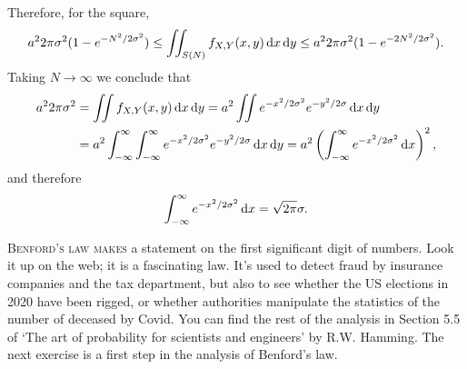 \documentclass[lectures]{subfiles}
\begin{document}
\begin{exercise}
\begin{solution}
Therefore, for the square,
\begin{equation}
a^{2}2\pi{\sigma^{2}} (1-e^{-N^{2}/2\sigma^{2}}) \leq
  \iint_{S(N)}f_{X,Y}(x,y) \,\textrm{d}x\,\textrm{d}y \leq
a^{2}2\pi{\sigma^{2}} (1-e^{-2N^{2}/2\sigma^{2}}).
\end{equation}
Taking $N\to\infty$ we conclude that
\begin{align}
a^{2}2\pi{\sigma^{2}}
&=\iint f_{X,Y}(x,y) \,\textrm{d}x\,\textrm{d}y
=a^{2}  \iint e^{-x^{2}/2\sigma^{2}} e^{-y^{2}/2\sigma} \,\textrm{d}x\,\textrm{d}y\\
&=a^{2}  \int_{-\infty}^{\infty} \int_{-\infty}^{\infty }e^{-x^{2}/2\sigma^{2}} e^{-y^{2}/2\sigma} \,\textrm{d}x\,\textrm{d}y
=a^{2} \left( \int_{-\infty}^{\infty }e^{-x^{2}/2\sigma^{2}} \,\textrm{d}x\right)^{2},
\end{align}
and therefore
\begin{equation}
\label{eq:0518}
\int_{-\infty}^{\infty }e^{-x^{2}/2\sigma^{2}} \,\textrm{d}x = \sqrt{2 \pi}\sigma.
\end{equation}
\end{solution}
\end{exercise}


\textsc{Benford's law makes} a statement on the first significant digit of numbers.
Look it up on the web; it is a fascinating law.
It's used to detect fraud by insurance companies and the tax department, but also to see whether the US elections in 2020 have been rigged, or whether authorities manipulate the statistics of the number of deceased by Covid.
You can find the rest of the analysis in Section 5.5 of `The art of probability for scientists and engineers' by R.W.
Hamming. The next exercise is a first step in the analysis of Benford's law.
\end{document}
